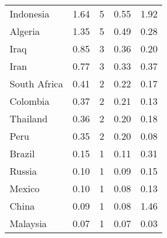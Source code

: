 \begin{longtable}[t]{lrrrr}
Indonesia & 1.64 & 5 & 0.55 & 1.92\\
Algeria & 1.35 & 5 & 0.49 & 0.28\\
Iraq & 0.85 & 3 & 0.36 & 0.20\\
Iran & 0.77 & 3 & 0.33 & 0.37\\
South Africa & 0.41 & 2 & 0.22 & 0.17\\
Colombia & 0.37 & 2 & 0.21 & 0.13\\
Thailand & 0.36 & 2 & 0.20 & 0.18\\
Peru & 0.35 & 2 & 0.20 & 0.08\\
Brazil & 0.15 & 1 & 0.11 & 0.31\\
Russia & 0.10 & 1 & 0.09 & 0.15\\
Mexico & 0.10 & 1 & 0.08 & 0.13\\
China & 0.09 & 1 & 0.08 & 1.46\\
Malaysia & 0.07 & 1 & 0.07 & 0.03\\
\bottomrule
\end{longtable}